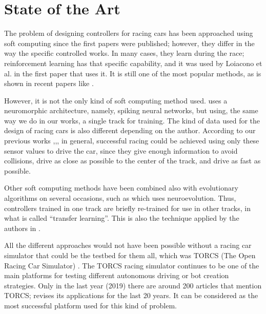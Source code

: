 \documentclass[10pt,journal,compsoc]{IEEEtran}
\begin{document}
\section{State of the Art}
\label{sec:soa}

The problem of designing controllers for racing cars has been
approached using soft computing since the first papers were
published; however, they differ in the way the specific controlled
works. In many cases, they learn during the race; reinforcement
learning has that specific capability, and it was used by Loiacono et
al. \cite{loiacono2010learning} in the first paper that uses it. It is still one of the most popular methods, as is shown in recent papers like \cite{remondaformula,waghdistributed}.

However, it is not the only kind of soft computing method
used. \cite{mirus2019short} uses a neuromorphic architecture, namely,
spiking neural networks, but using, the same way we do in our works, a single track for training. The kind of data used for the design of racing cars is
also different depending on the author. 
According to our previous works \cite{salem_evo17},\cite{salem_evo18},\cite{salem_cig2018}, in general, successful racing could be achieved using only these sensor values to drive the car, since they give enough information to avoid collisions, drive as close as possible to the center of the track, and drive as fast as possible.

Other soft computing methods have been combined also with evolutionary algorithms on several occasions, such as \cite{10.1371/journal.pone.0213193} which uses neuroevolution. Thus, controllers trained in one track are briefly re-trained for use in other tracks, in what is called ``transfer learning''. This is also the technique applied by the authors in \cite{verma2018programmatically}. 



All the different approaches would not have been possible without a
racing car simulator that could be the testbed for them all, which was
TORCS (The Open Racing Car Simulator) \cite{torcs4}. The TORCS racing simulator
continues to be one of the main platforms for testing different autonomous driving or bot creation strategies. Only in the last year (2019) there are around 200 articles that mention TORCS; \cite{badue2019selfdriving} revises its applications for the last 20 years. It can be considered as the most successful platform used for this kind of problem.
\end{document}
